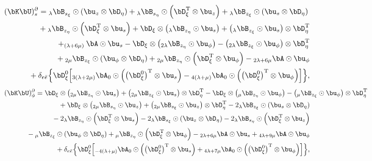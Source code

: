 \begin{eqnarray}
\lefteqn{
(\bK\bU)_s^{\partial}=
{{}_\lambda\bB}_{s_\xi} \odot \left(\bu_z\otimes\bD_{\eta}\right)+
{{}_\lambda\bB}_{s_\eta} \odot \left(\bD_\xi^{\rm{T}}\otimes{\bu_z}\right)+
{{}_\lambda\bB}_{z_\xi} \odot
\left(\bu_s{}\otimes\bD_{\eta}\right)}
\nonumber\\&&\mbox{}\hspace{2.2em}
+{{}_\lambda\bB}_{z_\eta} \odot \left(\bD_\xi^{\rm{T}}\otimes{\bu_s}\right)
+ \bD_{\xi}\otimes\left({{}_\lambda\bB}_{z_\eta} \odot {\bu_s}\right)
+\left({{}_\lambda\bB}_{z_\xi} \odot {\bu_s}\right)\otimes\bD_{\eta}^{\rm{T}}
\nonumber\\&&\mbox{}\hspace{2.2em}
+ _{(\lambda+6\mu)}\bA\odot\bu_s
-\bD_\xi\otimes\left({}_{2\lambda}\bB_{z_\eta}\odot{\bu_\phi}\right)
- \left({}_{2\lambda}\bB_{z_\xi}\odot{\bu_\phi}\right)\otimes\bD^{\rm{T}}_\eta
 \nonumber\\&&\mbox{}\hspace{2.2em}
+{}_{2\mu}\bB_{z_\xi}\odot\left(\bu_\phi\otimes\bD_\eta\right)
+{}_{2\mu}\bB_{z_\eta}\odot\left(\bD^{\rm{T}}_\xi\otimes \bu_\phi\right)
 - {}_{2\lambda+6\mu}\bA\odot \bu_\phi
 \nonumber\\&&\mbox{}\hspace{2.2em}
+ \delta_{e\bar{e}}\Bigl\{
\bD^0_\xi\Bigl[{}_{3(\lambda+2\mu)}{\bA_0}\odot
\left(\left(\bD^0_\xi\right)^{\rm{T}}\otimes \bu_s\right)
-{}_{4(\lambda+\mu)}{\bA_0}
\odot\left(\left(\bD^0_\xi\right)^{\rm{T}} \otimes \bu_\phi\right)\Bigr]
\Bigr\},
\end{eqnarray}
%
\begin{eqnarray}
\lefteqn{(\bK\bU)_\phi^{\partial} =
\bD_\xi\otimes\left({}_{2\mu}\bB_{z_\eta}\odot{\bu_s}\right)+
\left({}_{2\mu}\bB_{z_\xi}\odot{\bu_s}\right)\otimes\bD^{\rm{T}}_\eta-
\bD_\xi\otimes\left({}_{\mu}\bB_{z_\eta}\odot{\bu_\phi}\right)-
\left({}_{\mu}\bB_{z_\xi}\odot{\bu_\phi}\right)\otimes\bD^{\rm{T}}_\eta
}\nonumber\\&&\mbox{}\hspace{2.2em}
+\bD_\xi\otimes\left(_{2\mu}\bB_{s_\eta}\odot{\bu_z}\right)
+\left({}_{2\mu}\bB_{s_\xi}\odot{\bu_z}\right)\otimes\bD^{\rm{T}}_\eta-
2{}_\lambda\bB_{z_\xi}\odot\left(\bu_s\otimes\bD_\eta\right)
\nonumber\\&&\mbox{}\hspace{2.2em}
-2{}_\lambda\bB_{z_\eta}\odot\left(\bD^{\rm{T}}_\xi\otimes \bu_s\right)
-2{}_\lambda\bB_{s_\xi}\odot\left(\bu_z\otimes\bD_\eta\right)
- 2{}_\lambda\bB_{s_\eta}\odot\left(\bD^{\rm{T}}_\xi\otimes \bu_z\right)
\nonumber\\&&\mbox{}\hspace{2.2em}
-{}_{\mu}\bB_{z_\xi}\odot\left(\bu_\phi\otimes\bD_\eta\right)
+{}_{\mu}\bB_{z_\eta}\odot\left(\bD^{\rm{T}}_\xi\otimes \bu_\phi\right)
-{}_{2\lambda+6\mu}\bA\odot \bu_s
+ {}_{4\lambda+9\mu}\bA\odot \bu_\phi
\nonumber\\&&\mbox{}\hspace{2.2em}
+\delta_{e\bar{e}}\Bigl\{\bD^0_\xi\Bigl[
{}_{-4(\lambda+\mu)}{\bA_0}
\odot\left(\left(\bD^0_\xi\right)^{\rm{T}} \otimes \bu_s\right)
+{}_{4\lambda+7\mu}{\bA_0}
\odot\left(\left(\bD^0_\xi\right)^{\rm{T}} \otimes \bu_\phi\right)\Bigr]
\Bigr\},
\end{eqnarray}
